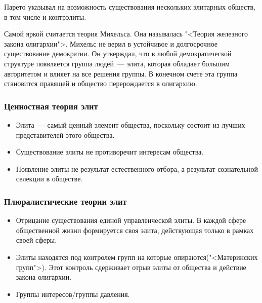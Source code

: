 Парето указывал на возможность существования нескольких элитарных обществ, в том числе и контрэлиты.

Самой яркой считается теория Михельса. Она называлась "<Теория железного закона олигархии">. Михельс не верил в устойчивое и долгосрочное существование демократии. Он утверждал, что в любой демократической структуре появляется группа людей~--- элита, которая обладает большим авторитетом и влияет на все решения группы. В конечном счете эта группа становится правящей и общество перерождается в олигархию.

\subsubsection{Ценностная теория элит}
\begin{itemize}
	\item Элита~--- самый ценный элемент общества, поскольку состоит из лучших представителей этого общества.
	\item Существование элиты не противоречит интересам общества. 
	\item Появление элиты не результат естественного отбора, а результат сознательной селекции в обществе.
\end{itemize}
\subsubsection{Плюралистические теории элит}
\begin{itemize}
	\item Отрицание существования единой управленческой элиты. В каждой сфере общественной жизни формируется своя элита, действующая только в рамках своей сферы.
	\item Элиты находятся под контролем групп на которые опираются("<Материнских групп">). Этот контроль сдерживает отрыв элиты от общества и действие закона олигархии.
	\item Группы интересов/группы давления.
\end{itemize}

